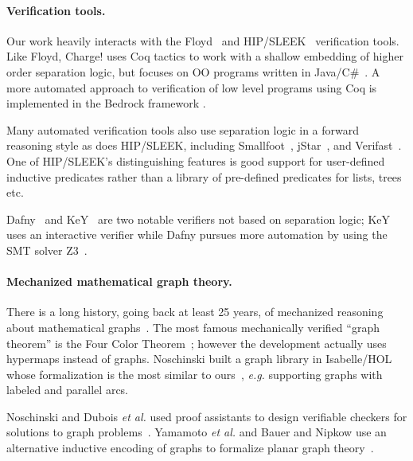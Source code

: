 \vspace{-1ex}
\paragraph{Verification tools.}
Our work heavily interacts with the Floyd~\cite{appel:programlogics} and HIP/SLEEK~\cite{chin:hipsleek} verification tools.  Like Floyd, Charge! uses Coq tactics to work with a shallow embedding of higher order separation logic, but focuses on OO programs written in Java/C\#~\cite{bengtson:charge}.  A  more automated approach to verification of low level programs using Coq is implemented in the Bedrock framework \cite{chlipala:bedrock}.

Many automated verification tools also use separation logic in a forward reasoning style as does HIP/SLEEK, including Smallfoot~\cite{berdine:smallfoot}, jStar~\cite{DistefanoP08}, and Verifast~\cite{jacobs:verifast}.  One of HIP/SLEEK's distinguishing features is good support for user-defined inductive predicates rather than a library of pre-defined predicates for lists, trees etc.

Dafny~\cite{Leino10} and KeY~\cite{Beckert:2007} are two notable verifiers not based on separation logic; KeY uses an interactive verifier while Dafny pursues more automation by using the SMT solver Z3~\cite{Moura2008}.

\vspace{-1ex}
\paragraph{Mechanized mathematical graph theory.} There is a long history,
going back at least 25 years, of mechanized reasoning about mathematical
graphs~\cite{wong1991}.  The most famous mechanically verified ``graph theorem''
is the Four Color Theorem~\cite{gonthier2005computer}; however
the development actually uses hypermaps instead of graphs.
Noschinski built a graph library in Isabelle/HOL whose formalization
is the most similar to ours~\cite{Noschinski2015}, \emph{e.g.} supporting
graphs with labeled and parallel arcs.

Noschinski and Dubois \emph{et al.} used proof assistants to design verifiable
checkers for solutions to graph problems~\cite{noschinski2015formalizing,dubois2015graphes}.
Yamamoto \emph{et al.} and Bauer and Nipkow use an alternative inductive
encoding of graphs to formalize planar graph theory~\cite{yamamoto1995formalization,bauer20025}.




